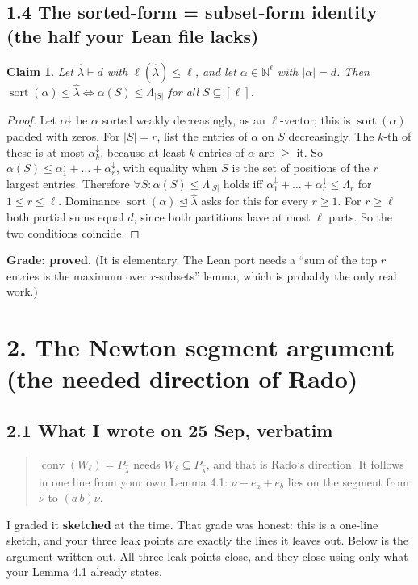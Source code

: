 \documentclass[11pt]{amsart}
\newcommand{\lh}{\hat\lambda}
\newcommand{\N}{\mathbb{N}}
\newcommand{\sort}{\operatorname{sort}}
\newcommand{\dom}{\trianglelefteq}
\newtheorem*{claim}{Claim}
\begin{document}
\subsection*{1.4 The sorted-form = subset-form identity (the half your Lean file lacks)}
\begin{claim}
Let $\lh\vdash d$ with $\ell(\lh)\le\ell$, and let $\alpha\in\N^\ell$ with $|\alpha|=d$. Then $\sort(\alpha)\dom\lh\iff\alpha(S)\le\Lambda_{|S|}$ for all $S\subseteq[\ell]$.
\end{claim}
\begin{proof}
Let $\alpha^\downarrow$ be $\alpha$ sorted weakly decreasingly, as an $\ell$-vector; this is $\sort(\alpha)$ padded with zeros. For $|S|=r$, list the entries of $\alpha$ on $S$ decreasingly. The $k$-th of these is at most $\alpha^\downarrow_k$, because at least $k$ entries of $\alpha$ are $\ge$ it. So $\alpha(S)\le\alpha^\downarrow_1+\dots+\alpha^\downarrow_r$, with equality when $S$ is the set of positions of the $r$ largest entries. Therefore $\forall S:\alpha(S)\le\Lambda_{|S|}$ holds iff $\alpha^\downarrow_1+\dots+\alpha^\downarrow_r\le\Lambda_r$ for $1\le r\le\ell$. Dominance $\sort(\alpha)\dom\lh$ asks for this for every $r\ge1$. For $r\ge\ell$ both partial sums equal $d$, since both partitions have at most $\ell$ parts. So the two conditions coincide.
\end{proof}
\noindent\textbf{Grade: proved.} (It is elementary. The Lean port needs a ``sum of the top $r$ entries is the maximum over $r$-subsets'' lemma, which is probably the only real work.)

\section*{2. The Newton segment argument (the needed direction of Rado)}

\subsection*{2.1 What I wrote on 25 Sep, verbatim}
\begin{quote}
$\operatorname{conv}(W_\ell)=P_{\lh}$ needs $W_\ell\subseteq P_{\lh}$, and that is Rado's direction. It follows in one line from your own Lemma 4.1: $\nu-e_a+e_b$ lies on the segment from $\nu$ to $(a\,b)\nu$.
\end{quote}
I graded it \textbf{sketched} at the time. That grade was honest: this is a one-line sketch, and your three leak points are exactly the lines it leaves out. Below is the argument written out. All three leak points close, and they close using only what your Lemma 4.1 already states.
\end{document}
